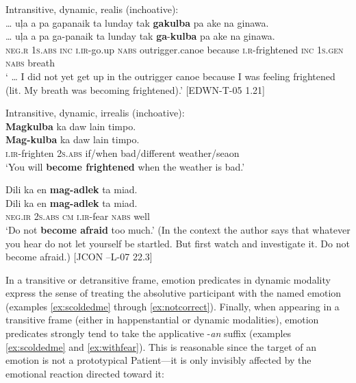 \ea
\label{ex:mybreathing}
Intransitive, dynamic, realis  (inchoative): \\
 … uļa a pa gapanaik ta lunday tak \textbf{gakulba} pa ake na ginawa. \\\smallskip
\gll  … uļa a pa ga-panaik ta lunday tak \textbf{ga}-\textbf{kulba} pa ake na ginawa.\footnotemark{} \\
{} \textsc{neg.r}    1\textsc{s.abs} \textsc{inc} \textsc{i.ir}-go.up \textsc{nabs} outrigger.canoe because \textsc{i.r}-frightened \textsc{inc} 1\textsc{s.gen} \textsc{nabs} breath \\
\glt ` … I did not yet get up in the outrigger canoe because I was feeling frightened (lit. My breath was becoming frightened).' [EDWN-T-05 1.21]
\z

\newpage
\ea
Intransitive, dynamic, irrealis  (inchoative): \\
\label{ex:weatherisbad}
\textbf{Magkulba}  ka  daw  lain  timpo. \\\smallskip
\gll \textbf{Mag-kulba}  ka  daw  lain  timpo. \\
\textsc{i.ir}-frighten  2\textsc{s.abs}  if/when  bad/different  weather/seaon \\
\glt ‘You will \textbf{become frightened} when the weather is bad.’ \\
\z

\ea
\label{bkm:Ref122550199} \label{ex:afraidtoomuch}
Dili  ka  en  \textbf{mag-adlek}  ta  miad. \\\smallskip
\gll Dili  ka  en  \textbf{mag-adlek}  ta  miad. \\
\textsc{neg.ir}  2\textsc{s.abs}  \textsc{cm}  \textsc{i.ir}-fear  \textsc{nabs}  well \\
\glt ‘Do not \textbf{become afraid} too much.’ (In the context the author says that whatever you hear do not let yourself be startled. But first watch and investigate it. Do not become afraid.) [JCON –L-07 22.3]
\z

In a transitive or detransitive frame, emotion predicates in dynamic modality express the sense of treating the absolutive participant with the named emotion (examples \ref{ex:scoldedme} through \ref{ex:notcorrect}). Finally, when appearing in a transitive frame (either in happenstantial or dynamic modalities), emotion predicates strongly tend to take the applicative -\textit{an} suffix (examples \ref{ex:scoldedme} and \ref{ex:withfear}). This is reasonable since the target of an emotion is not a prototypical Patient---it is only invisibly affected by the emotional reaction directed toward it:

